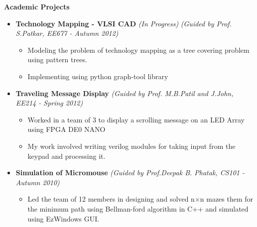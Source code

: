 \documentclass[a4paper,10pt]{article}
\newcommand{\isep}{-2 pt}
\newcommand{\resheading}[1]{{\small \colorbox{mygrey}{\begin{minipage}{0.975\textwidth}{\textbf{#1 \vphantom{p\^{E}}}}\end{minipage}}}}
\begin{document}
\resheading{\textbf{\large Academic Projects}}
\begin{itemize}
\item \textbf{Technology Mapping - VLSI CAD} \hfill \emph{(In Progress)} \hfill \emph{(Guided by Prof. S.Patkar, EE677 - Autumn 2012)} \\[-0.6cm]
    \begin{itemize} 
        \item Modeling the problem of technology mapping as a tree covering problem using pattern trees. \\[-0.6cm]
        \item Implementing using python graph-tool library \\[-0.6cm]
    \end{itemize}
\item \textbf{Traveling Message Display} \hfill \emph{(Guided by Prof. M.B.Patil and J.John, EE214 - Spring 2012)}\\[-0.6cm]
    \begin{itemize}
        \item Worked in a team of 3 to display a scrolling message on an LED Array using FPGA DE0 NANO\\[-0.6cm]
        \item My work involved writing verilog modules for taking input from the keypad and processing it.\\[-0.6cm]
    \end{itemize}
\item \textbf{Simulation of Micromouse} \hfill \emph{(Guided by Prof.Deepak B. Phatak, CS101 - Autumn 2010)}\\[-0.7cm]
	\begin{itemize}
	    \item Led the team of 12 members in designing and solved n$\times$n mazes them for the minimum path using Bellman-ford algorithm in C++ and simulated using EzWindows GUI.\\[-0.6cm]
	\end{itemize} 
\begin{comment}
\item \textbf{Term paper on Working of a Cordless Telephone} \emph{(Guided by Prof. Vasi J. , EE112 - Spring 2011)\\[-0.7cm]}
	\begin{itemize} \itemsep \isep
	  \item Opened and Analyzed a Cordless phone in a team of 3 members and written a 12-page Term paper with details of working of the phone.
	  \end{itemize}
\end{comment}
\end{itemize}
\end{document}
